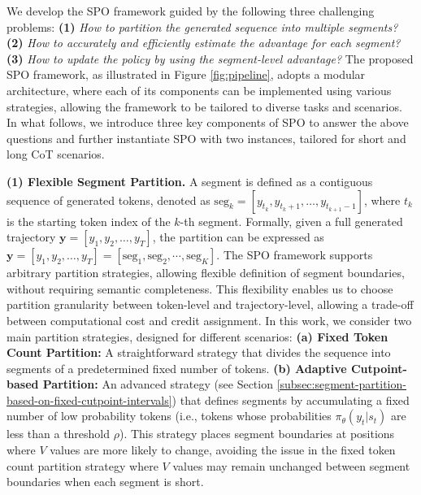 We develop the SPO framework guided by the following three challenging problems: \textbf{(1)} \textit{How to partition the generated sequence into multiple segments?} \textbf{(2)} \textit{How to accurately and efficiently estimate the advantage for each segment?} \textbf{(3)} \textit{How to update the policy by using the segment-level advantage?} The proposed SPO framework, as illustrated in Figure \ref{fig:pipeline}, adopts a modular architecture, where each of its components can be implemented using various strategies, allowing the framework to be tailored to diverse tasks and scenarios. In what follows, we introduce three key components of SPO to answer the above questions and further instantiate SPO with two instances, tailored for short and long CoT scenarios.

\textbf{(1) Flexible Segment Partition.} A segment is defined as a contiguous sequence of generated tokens, denoted as \(\text{seg}_k = [y_{t_k}, y_{t_k+1}, \dots, y_{t_{k+1}-1}]\), where \(t_k\) is the starting token index of the \(k\)-th segment.  Formally, given a full generated trajectory \(\boldsymbol y = [y_1, y_2, \dots, y_T]\),  the partition can be expressed as \(\boldsymbol y = [y_1, y_2, \dots, y_T]=[\text{seg}_1,\text{seg}_2,\cdots,\text{seg}_K]\). The SPO framework supports arbitrary partition strategies, allowing flexible definition of segment boundaries, without requiring semantic completeness. This flexibility enables us to choose partition granularity between token-level and trajectory-level, allowing a trade-off between computational cost and credit assignment. In this work, we consider two main partition strategies, designed for different scenarios: \textbf{(a) Fixed Token Count Partition:} A straightforward strategy that divides the sequence into segments of a predetermined fixed number of tokens. \textbf{(b) Adaptive Cutpoint-based Partition:} An advanced strategy (see Section \ref{subsec:segment-partition-based-on-fixed-cutpoint-intervals}) that defines segments by accumulating a fixed number of low probability tokens (i.e., tokens whose probabilities $\pi_\theta(y_t|s_t)$ are less than a threshold $\rho$). This strategy places segment boundaries at positions where \( V \) values are more likely to change, avoiding the issue in the fixed token count partition strategy where \( V \) values may remain unchanged between segment boundaries when each segment is short.


